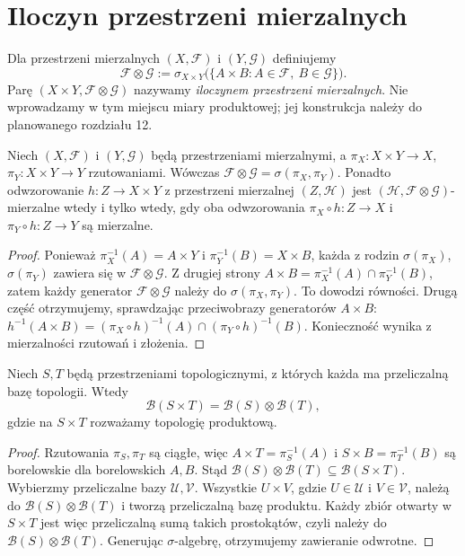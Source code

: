 \section{Iloczyn przestrzeni mierzalnych}

\begin{definicja}
\label{def:product-sigma}
Dla przestrzeni mierzalnych $(X,\mathcal F)$ i
$(Y,\mathcal G)$ definiujemy
\[
\mathcal F\otimes\mathcal G
:=\sigma_{X\times Y}\bigl(\{A\times B:A\in\mathcal F,\ B\in\mathcal G\}\bigr).
\]
Parę $(X\times Y,\mathcal F\otimes\mathcal G)$
nazywamy \emph{iloczynem przestrzeni mierzalnych}.
Nie wprowadzamy w tym miejscu miary produktowej;
jej konstrukcja należy do planowanego rozdziału 12.
\end{definicja}

\begin{twierdzenie}
\label{thm:product-projections}
Niech $(X,\mathcal F)$ i $(Y,\mathcal G)$ będą
przestrzeniami mierzalnymi, a
$\pi_X:X\times Y\to X$, $\pi_Y:X\times Y\to Y$
rzutowaniami. Wówczas
$\mathcal F\otimes\mathcal G=\sigma(\pi_X,\pi_Y)$.
Ponadto odwzorowanie $h:Z\to X\times Y$ z przestrzeni
mierzalnej $(Z,\mathcal H)$ jest
$(\mathcal H,\mathcal F\otimes\mathcal G)$-mierzalne
wtedy i tylko wtedy, gdy oba odwzorowania
$\pi_X\circ h:Z\to X$ i $\pi_Y\circ h:Z\to Y$ są mierzalne.
\end{twierdzenie}
\begin{proof}
Ponieważ $\pi_X^{-1}(A)=A\times Y$ i
$\pi_Y^{-1}(B)=X\times B$, każda z rodzin
$\sigma(\pi_X)$, $\sigma(\pi_Y)$ zawiera się w
$\mathcal F\otimes\mathcal G$. Z drugiej strony
$A\times B=\pi_X^{-1}(A)\cap\pi_Y^{-1}(B)$,
zatem każdy generator $\mathcal F\otimes\mathcal G$
należy do $\sigma(\pi_X,\pi_Y)$. To dowodzi równości.
Drugą część otrzymujemy, sprawdzając przeciwobrazy
generatorów $A\times B$:
$h^{-1}(A\times B)=(\pi_X\circ h)^{-1}(A)
\cap(\pi_Y\circ h)^{-1}(B)$.
Konieczność wynika z mierzalności rzutowań i złożenia.
\end{proof}

\begin{twierdzenie}
\label{thm:borel-product}
Niech $S,T$ będą przestrzeniami topologicznymi, z których
każda ma przeliczalną bazę topologii. Wtedy
\[
\mathcal B(S\times T)=\mathcal B(S)\otimes\mathcal B(T),
\]
gdzie na $S\times T$ rozważamy topologię produktową.
\end{twierdzenie}
\begin{proof}
Rzutowania $\pi_S,\pi_T$ są ciągłe, więc
$A\times T=\pi_S^{-1}(A)$ i $S\times B=\pi_T^{-1}(B)$
są borelowskie dla borelowskich $A,B$.
Stąd $\mathcal B(S)\otimes\mathcal B(T)\subseteq
\mathcal B(S\times T)$.
Wybierzmy przeliczalne bazy $\mathcal U,\mathcal V$.
Wszystkie $U\times V$, gdzie $U\in\mathcal U$ i
$V\in\mathcal V$, należą do
$\mathcal B(S)\otimes\mathcal B(T)$ i tworzą
przeliczalną bazę produktu. Każdy zbiór otwarty
w $S\times T$ jest więc przeliczalną sumą takich
prostokątów, czyli należy do $\mathcal B(S)\otimes\mathcal B(T)$.
Generując $\sigma$-algebrę, otrzymujemy zawieranie odwrotne.
\end{proof}

